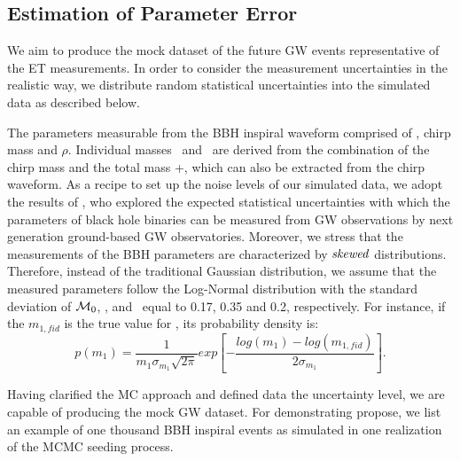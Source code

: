 \documentclass[twocolumn]{aastex62}
\newcommand{\kai}[1]{\textcolor{red}{[{\bf Kai}: #1]}}
\begin{document}
\subsection{Estimation of Parameter Error} \label{sec_noiselevel}
We aim to produce the mock dataset of the future GW events representative of the ET  measurements. In order to consider the measurement uncertainties in the realistic way, we distribute random statistical uncertainties into the simulated data as described below.

The parameters measurable from the BBH inspiral waveform comprised of \dl, chirp mass and $\rho$. Individual masses \mone\ and \mtwo\ are derived from the combination of the chirp mass and the total mass \mone+\mtwo, which can also be extracted from the chirp waveform. As a recipe to set up the noise levels of our simulated data, we adopt the results of \citet{Ghosh2016}, who  explored the expected statistical uncertainties with which the parameters of black hole binaries can be measured from GW observations by next generation ground-based GW observatories. 
Moreover, we stress that the measurements of the BBH parameters are characterized by ${\it skewed}$ distributions. Therefore, instead of the traditional Gaussian distribution, we assume that the measured parameters follow the Log-Normal distribution with the standard deviation of  ${\cal M}_0$, \dl, and \mone\ equal to 0.17, 0.35 and 0.2, respectively. For instance, if the $m_{1,fid}$ is the true value for \mone, its probability density is:
 \begin{equation} \label{equ_lognorm}
p(m_1) = \frac{1}{m_1 \sigma_{m_1} \sqrt{2\pi}} exp \left[- \frac{log(m_1)-log(m_{1,fid})}{2\sigma_{m_1}} \right].
 \end{equation}
 

Having clarified the MC approach and defined data the uncertainty level, we are capable of producing the mock GW dataset. For demonstrating propose, we list an example of one thousand BBH inspiral events as simulated in one realization of the MCMC seeding process. %
\end{document}
